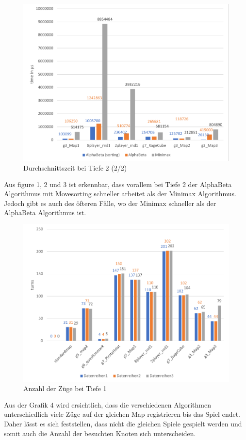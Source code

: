 \begin{figure}[h]
	\begin{center}
		\includegraphics{Depth_2_2_avgtime.pdf}
		\caption{Durchschnittszeit bei Tiefe 2 (2/2)}
		\label{fig::avgtime Depth 2.2}
	\end{center}
\end{figure}
Aus figure 1, 2 und 3 ist erkennbar, dass vorallem bei Tiefe 2 der AlphaBeta Algorithmus mit Movesorting schneller arbeitet als der Minimax Algorithmus.
Jedoch gibt es auch des öfteren Fälle, wo der Minimax schneller als der AlphaBeta Algorithmus ist.

\begin{figure}[h]
	\begin{center}
		\includegraphics{Depth_1_turns.pdf}
		\caption{Anzahl der Züge bei Tiefe 1}
		\label{fig::turns Depth1}
	\end{center}
\end{figure}

Aus der Grafik 4 wird ersichtlich, dass die verschiedenen Algorithmen unterschiedlich viele Züge auf der gleichen Map registrieren bis das Spiel endet. Daher lässt es sich feststellen, dass nicht die gleichen Spiele gespielt werden und somit auch die Anzahl der besuchten Knoten sich unterscheiden. 




